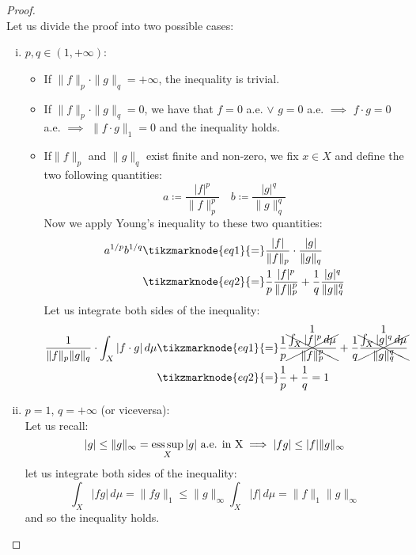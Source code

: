 \begin{proof}
    \hspace*{\fill}\\ %
    Let us divide the proof into two possible cases:
    \begin{enumerate}[i)]
        \item $p,q \in (1,+\infty)$:
            \begin{itemize}
                \item If $\|f\|_p\cdot\|g\|_q=+\infty$, the inequality is trivial.
                \item If $\|f\|_p\cdot\|g\|_q=0$, we have that $f=0$ a.e. $\vee$ $g=0$ a.e. $\implies$ $f\cdot g=0$ a.e. $\implies$ $\|f\cdot g\|_1=0$ and the inequality holds.
                \item If$\|f\|_p$ and $\|g\|_q$ exist finite and non-zero, we fix $x\in X$ and define the two following quantities:
                    \[ a \coloneqq \frac{|f|^p}{\|f\|^p_p} \quad b \coloneqq \frac{|g|^q}{\|g\|^q_q} \]
                    Now we apply Young's inequality to these two quantities:
                    \begin{align*}
                        a^{1/p} b ^{1/q} & \tikzmarknode{eq1}{=} \frac{|f|}{\|f\|_p} \cdot \frac{|g|}{\|g\|_q} \\
                        & \tikzmarknode{eq2}{=} \frac{1}{p}\frac{|f|^p}{\|f\|^p_p} + \frac{1}{q}\frac{|g|^q}{\|g\|^q_q}
                    \end{align*}
                    Let us integrate both sides of the inequality:
                    \begin{align*}
                        \frac{1}{\|f\|_p\|g\|_q} \cdot \int_X |f \cdot g| \, d\mu & \tikzmarknode{eq1}{=} \frac{1}{p}\cancelnum{1}{\frac{\int_X |f|^p \, d\mu}{\|f\|^p_p}} + \frac{1}{q}\cancelnum{1}{\frac{\int_X |g|^q \, d\mu}{\|g\|^q_q}} \\
                        & \tikzmarknode{eq2}{=} \frac{1}{p} + \frac{1}{q} = 1
                    \end{align*}
            \end{itemize}
        \item $p=1$, $q=+\infty$ (or viceversa): \\
            Let us recall:
            \[ |g| \leq \|g\|_\infty = \operatorname*{ess\,sup}_X |g| \text{ a.e. in X} \implies |fg| \leq |f| \|g\|_\infty \]
            let us integrate both sides of the inequality:
            \[ \int_X |fg| \, d\mu = \|fg\|_1 \leq \|g\|_\infty \int_X |f| \, d\mu = \|f\|_1 \|g\|_\infty \]
            and so the inequality holds.
    \end{enumerate}

\end{proof}

